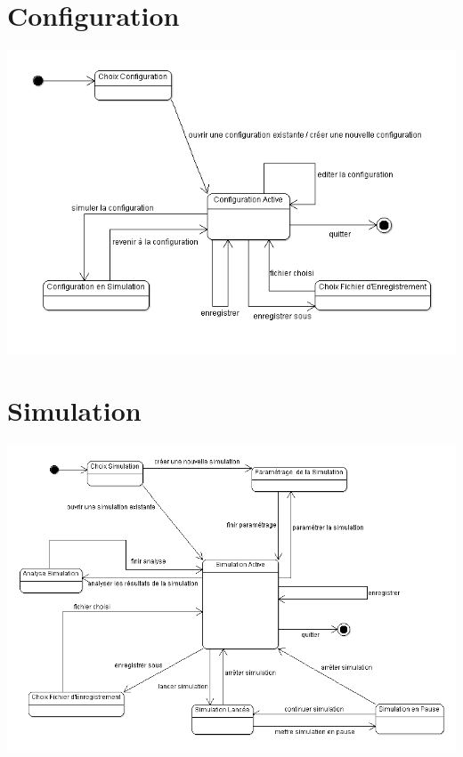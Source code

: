 \section{Configuration}
\begin{center}
\includegraphics[width=\textwidth]{../../DEC/DEC-Configuration.png}
\end{center}
\section{Simulation}
\begin{center}
\includegraphics[width=\textwidth]{../../DEC/DEC-Simulation.png}
\end{center}
